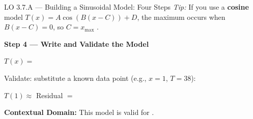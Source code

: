 \documentclass[10pt]{article}
\begin{document}
\begin{notesbox}{LO 3.7.A --- Building a Sinusoidal Model: Four Steps}
\vspace{6pt}
\textit{Tip:} If you use a \textbf{cosine} model $T(x) = A\cos(B(x-C)) + D$, the maximum
occurs when $B(x - C) = 0$, so $C = x_{\max}$ .

\vspace{10pt}
\textbf{Step 4 --- Write and Validate the Model}

$T(x) = $ 

\vspace{6pt}
Validate: substitute a known data point (e.g., $x = 1$, $T = 38$):

$T(1) \approx$  \quad Residual $= $ 

\vspace{6pt}
\textbf{Contextual Domain:} This model is valid for .

\end{notesbox}

\vspace{0.08in}
\end{document}
